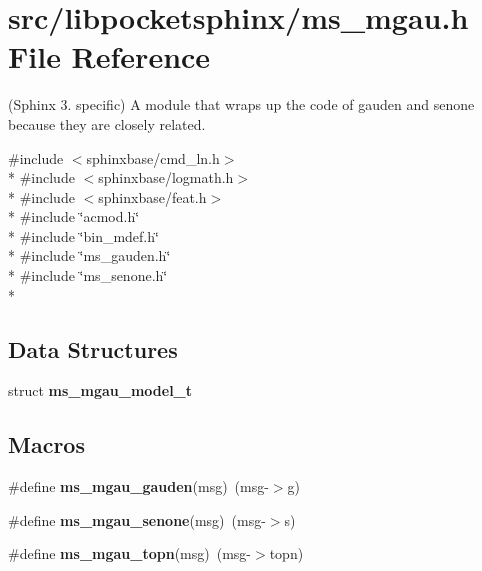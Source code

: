 \section{src/libpocketsphinx/ms\+\_\+mgau.h File Reference}
\label{ms__mgau_8h}


(Sphinx 3. specific) A module that wraps up the code of gauden and senone because they are closely related.  


{\ttfamily \#include $<$sphinxbase/cmd\+\_\+ln.\+h$>$}\\*
{\ttfamily \#include $<$sphinxbase/logmath.\+h$>$}\\*
{\ttfamily \#include $<$sphinxbase/feat.\+h$>$}\\*
{\ttfamily \#include \char`\"{}acmod.\+h\char`\"{}}\\*
{\ttfamily \#include \char`\"{}bin\+\_\+mdef.\+h\char`\"{}}\\*
{\ttfamily \#include \char`\"{}ms\+\_\+gauden.\+h\char`\"{}}\\*
{\ttfamily \#include \char`\"{}ms\+\_\+senone.\+h\char`\"{}}\\*
\subsection*{Data Structures}
\begin{DoxyCompactItemize}
\item 
struct {\bf ms\+\_\+mgau\+\_\+model\+\_\+t}
\end{DoxyCompactItemize}
\subsection*{Macros}
\begin{DoxyCompactItemize}
\item 
\#define {\bfseries ms\+\_\+mgau\+\_\+gauden}(msg)~(msg-\/$>$g)\label{ms__mgau_8h_a95f75d32387d89eb6fa2bc65e032d34c}

\item 
\#define {\bfseries ms\+\_\+mgau\+\_\+senone}(msg)~(msg-\/$>$s)\label{ms__mgau_8h_a182da1c0e7872e853566f7728001d00c}

\item 
\#define {\bfseries ms\+\_\+mgau\+\_\+topn}(msg)~(msg-\/$>$topn)\label{ms__mgau_8h_acad38d81d6485f2aad5176f8f4283579}

\end{DoxyCompactItemize}
